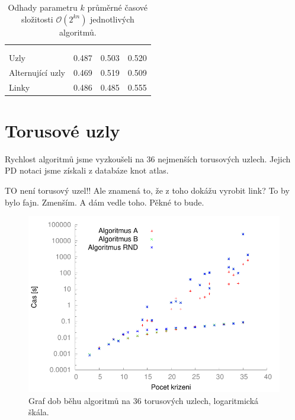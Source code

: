 \begin{table}[b!]

\centering

\begin{tabular}{l@{\hspace{1.5cm}}D{.}{,}{3}D{.}{,}{1.3}D{.}{,}{2.4}} 
\toprule
 & \mc{} & \mc{} & \mc{} \\
\mc{} &  &  &
 \\
\midrule
Uzly     & 0.487 & 0.503& 0.520 \\
Alternující uzly & 0.469 & 0.519 & 0.509 \\
Linky   & 0.486 & 0.485 &  0.555\\
\bottomrule
\end{tabular}

\caption{Odhady parametru $k$ průměrné časové složitosti $\mathcal{O}(2^{kn})$ jednotlivých algoritmů.}\label{tab03:algo}

\end{table}


\section{Torusové uzly} \label{torus}
Rychlost algoritmů jsme vyzkoušeli na 36 nejmenších torusových uzlech. Jejich PD notaci jsme získali z databáze knot atlas.

TO není torusový uzel!! Ale znamená to, že z toho dokážu vyrobit link? To by bylo fajn. Zmenším. A dám vedle toho. Pěkné to bude.

\begin{figure}[p]\centering
\includegraphics{../img/torusSrov}
\caption{Graf dob běhu algoritmů na 36 torusových uzlech, logaritmická škála.}
\label{obr03:torusSrov}
\end{figure}

